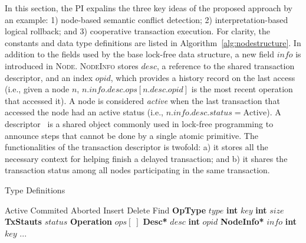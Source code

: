 In this section, the PI expalins the three key ideas of the proposed approach by an example: 1) node-based semantic conflict detection; 2) interpretation-based logical rollback; and 3) cooperative transaction execution.
For clarity, the constants and data type definitions are listed in Algorithm~\ref{alg:nodestructure}.
In addition to the fields used by the base lock-free data structure, a new field $info$ is introduced in \textsc{Node}.
\textsc{NodeInfo} stores $desc$, a reference to the shared transaction descriptor, and an index $opid$, which provides a history record on the last access (i.e., given a node $n$, $n.info.desc.ops[n.desc.opid]$ is the most recent operation that accessed it).
A node is considered \emph{active} when the last transaction that accessed the node had an active status (i.e., $n.info.desc.status=\text{Active}$).
A descriptor~\cite{herlihy2012art} is a shared object commonly used in lock-free programming to announce steps that cannot be done by a single atomic primitive.
The functionalities of the transaction descriptor is twofold: a) it stores all the necessary context for helping finish a delayed transaction; and b) it shares the transaction status among all nodes participating in the same transaction.

\vspace{-0.1in}
\begin{algorithm}[h]
    \caption{Type Definitions}
    \label{alg:nodestructure}
    \vspace{-0.2in}
    \begin{multicols}{2}
        \begin{algorithmic}[1]
            \State Active
            \State Commited
            \State Aborted
            \EndEnum
            \State Insert
            \State Delete
            \State Find
            \EndEnum
            \State \textbf{OpType} $type$
            \State \textbf{int} $key$
            \EndStruct
            \State \textbf{int} $size$
            \State \textbf{TxStauts} $status$
            \State \textbf{Operation} $ops[\;]$
            \EndStruct
            \State \textbf{Desc*} $desc$
            \State \textbf{int} $opid$
            \EndStruct
            \State \textbf{NodeInfo*} $info$
            \State \textbf{int} $key$
            \State ...
            \EndStruct
            \end{algorithmic}
    \end{multicols}
    \vspace{-0.15in}
\end{algorithm}

